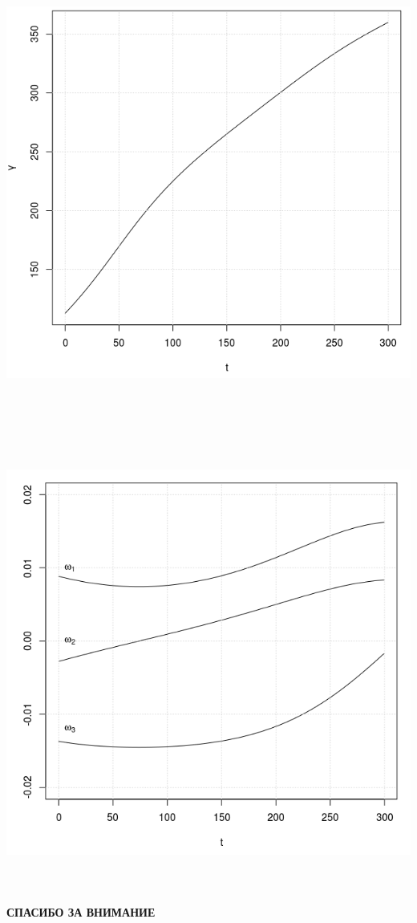 \documentclass[14pt]{extreport}
\begin{document}
\begin{landscape}
\begin{center}
\includegraphics[width=15cm, height=15cm]{gamma.png}
\end{center}
\end{landscape}

\begin{landscape}
\begin{center}
\includegraphics[width=15cm, height=15cm]{o300.png}
\end{center}
\end{landscape}

\newpage
\begin{landscape}
\vspace*{190px}
\begin{center}
 \Huge{\textbf{СПАСИБО ЗА ВНИМАНИЕ}}
\end{center}
\end{landscape}
\end{document}
